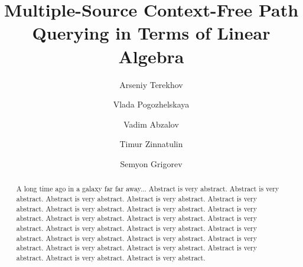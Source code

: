 \documentclass[sigconf,edbt,table]{acmart-edbt2021}
\begin{document}
\title{Multiple-Source Context-Free Path Querying in Terms of Linear Algebra}
  


\author{Arseniy Terekhov}

\author{Vlada Pogozhelskaya}

\author{Vadim Abzalov}

\author{Timur Zinnatulin}

\author{Semyon Grigorev}

\renewcommand{\shortauthors}{Arseniy Terekhov et al.}


\begin{abstract}
A long time ago in a galaxy far far away...
Abstract is very abstract. Abstract is very abstract. Abstract is very abstract. Abstract is very abstract. Abstract is very abstract. Abstract is very abstract. Abstract is very abstract. Abstract is very abstract. Abstract is very abstract. Abstract is very abstract. Abstract is very abstract. Abstract is very abstract. Abstract is very abstract. Abstract is very abstract. Abstract is very abstract. Abstract is very abstract. Abstract is very abstract. Abstract is very abstract. Abstract is very abstract. Abstract is very abstract. Abstract is very abstract. Abstract is very abstract. 
\end{abstract}
\end{document}
